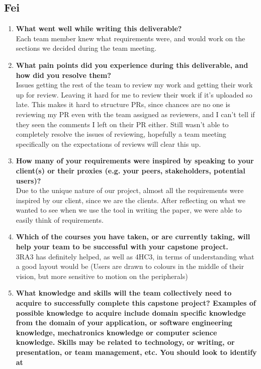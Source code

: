\subsection*{Fei}
\begin{enumerate}
  \item \textbf{What went well while writing this deliverable?} \\
  Each team member knew what requirements were, and would work on the sections we decided during the team meeting.
  \item \textbf{What pain points did you experience during this deliverable, and how did
  you resolve them?} \\
  Issues getting the rest of the team to review my work and getting their work up for review. Leaving it hard for me to review their work if it's uploaded so late. This makes it hard to structure PRs, since chances are no one is reviewing my PR even with the team assigned as reviewers, and I can't tell if they seen the comments I left on their PR either. Still wasn't able to completely resolve the issues of reviewing, hopefully a team meeting specifically on the expectations of reviews will clear this up.
  \item \textbf{How many of your requirements were inspired by speaking to your client(s) or their proxies (e.g. your peers, stakeholders, potential users)?} \\
  Due to the unique nature of our project, almost all the requirements were inspired by our client, since we are the clients. After reflecting on what we wanted to see when we use the tool in writing the paper, we were able to easily think of requirements.
  \item \textbf{Which of the courses you have taken, or are currently taking, will help your team to be successful with your capstone project.} \\
  3RA3 has definitely helped, as well as 4HC3, in terms of understanding what a good layout would be (Users are drawn to colours in the middle of their vision, but more sensitive to motion on the peripherals)
  \item \textbf{What knowledge and skills will the team collectively need to acquire to 
  successfully complete this capstone project?  Examples of possible knowledge
  to acquire include domain specific knowledge from the domain of your
  application, or software engineering knowledge, mechatronics knowledge or
  computer science knowledge.  Skills may be related to technology, or writing,
  or presentation, or team management, etc.  You should look to identify at
}
\end{enumerate}
